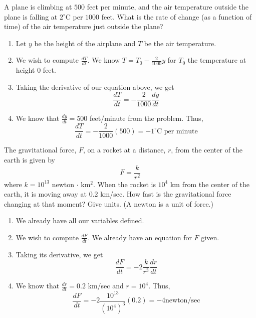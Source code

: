 \documentclass[11pt]{exam}
\begin{document}
\begin{questions}
  \question A plane is climbing at \(500\) feet per minute, and the
    air temperature outside the plane is falling at \(2^\circ\)C per
    \(1000\) feet. What is the rate of change (as a function of time)
    of the air temperature just outside the plane?
    \begin{solution}
      \begin{enumerate}
      \item Let \(y\) be the height of the airplane and \(T\)
        be the air temperature.
      \item We wish to compute \(\frac{dT}{dt}\). We know \(T =
        T_0-\frac{2}{1000}y\) for \(T_0\) the temperature at height
        \(0\) feet.\\
      \item Taking the derivative of our equation above, we get \[
          \frac{dT}{dt} = -\frac{2}{1000} \frac{dy}{dt}
        \]
      \item We know that \(\frac{dy}{dt} = 500\) feet/minute from the
        problem. Thus, \[
          \frac{dT}{dt} = -\frac{2}{1000}(500) = -1^\circ \text{C per minute}
        \]
      \end{enumerate}
    \end{solution}
  \question The gravitational force, \(F\), on a rocket at a distance,
    \(r\), from the center of the earth is given by \[
      F = \frac{k}{r^2}
    \]
    where \(k = 10^{13}\) newton \(\cdot\) km\({}^2\). When the rocket
    is \(10^4\) km from the center of the earth, it is moving away at
    \(0.2\) km/sec. How fast is the gravitational force changing at
    that moment? Give units. (A newton is a unit of force.)
    \begin{solution}
      \begin{enumerate}
      \item We already have all our variables defined.
      \item We wish to compute \(\frac{dF}{dt}\). We already have an
        equation for \(F\) given.
      \item Taking its derivative, we get \[
          \frac{dF}{dt} = -2 \frac{k}{r^3} \frac{dr}{dt}
        \]
      \item We know that \(\frac{dr}{dt} = 0.2\) km/sec and \(r =
        10^4\). Thus, \[
          \frac{dF}{dt} = -2 \frac{10^{13}}{(10^4)^3} (0.2) = -4 \text{newton/sec}
        \]
      \end{enumerate}
    \end{solution}

\end{questions}
\end{document}
